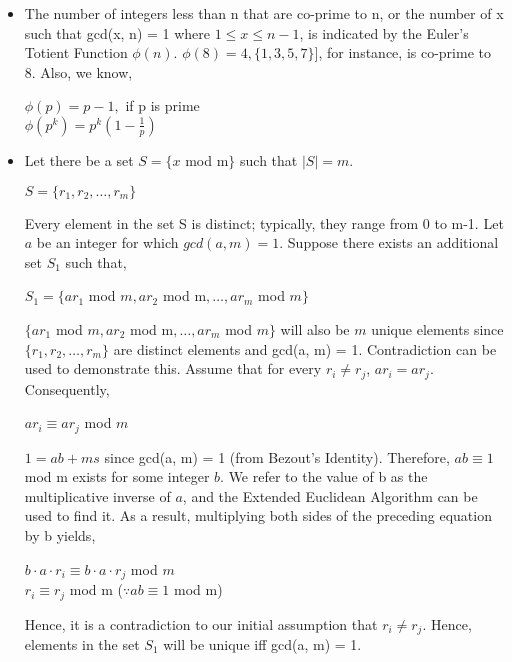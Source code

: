 \documentclass[11pt]{article}
\begin{document}
\begin{itemize}
    \item The number of integers less than n that are co-prime to n, or the number of x such that gcd(x, n) = 1 where $1 \leq x \leq n-1$, is indicated by the Euler's Totient Function $\phi(n)$. $\phi(8) = 4, \{1, 3,5,7\}]$, for instance, is co-prime to 8. Also, we know,
    \begin{center}
        $\phi(p) = p-1,$ if p is prime\\
        \vspace{1mm}
        $\phi(p^k) = p^k(1 - \frac{1}{p})$
    \end{center}
    \item Let there be a set $S = \{x$ mod m$\}$ such that $|S| = m$.
    \begin{center}
        $S = \{r_1, r_2,\hdots, r_m\}$
    \end{center}
    Every element in the set S is distinct; typically, they range from 0 to m-1. Let $a$ be an integer for which $gcd(a, m) = 1$. Suppose there exists an additional set $S_1$ such that,
    \begin{center}
        $S_1 = \{ar_1$ mod $m, ar_2$ mod m$,\hdots, ar_m$ mod $m\}$
    \end{center}
    $\{ar_1$ mod $m, ar_2$ mod m$,\hdots, ar_m$ mod $m\}$ will also be $m$ unique elements since $\{r_1, r_2,\hdots, r_m\}$ are distinct elements and gcd(a, m) = 1. Contradiction can be used to demonstrate this. Assume that for every $r_i \neq r_j$, $ar_i = ar_j$. Consequently,
    \begin{center}
        $ar_i \equiv ar_j$ mod $m$
    \end{center}
 $1 = ab + ms$ since gcd(a, m) = 1 (from Bezout's Identity). Therefore, $ab \equiv 1$ mod m exists for some integer $b$. We refer to the value of b as the multiplicative inverse of $a$, and the Extended Euclidean Algorithm can be used to find it.
    As a result, multiplying both sides of the preceding equation by b yields,
    \begin{center}
        $b\cdot a\cdot r_i \equiv b\cdot a \cdot r_j$ mod $m$\\
        \vspace{3mm}
        $r_i \equiv r_j$ mod m    ($\because ab \equiv 1$ mod m)
    \end{center}
    Hence, it is a contradiction to our initial assumption that $r_i \neq r_j$. Hence, elements in the set $S_1$ will be unique iff gcd(a, m) = 1.

\end{itemize}
\end{document}
